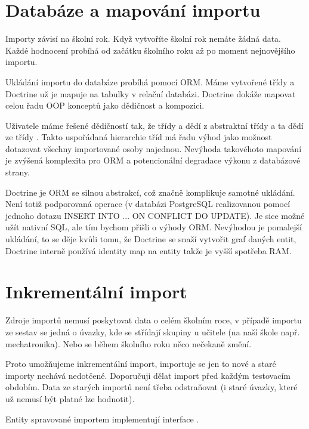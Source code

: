 \section{Databáze a mapování importu}

Importy závisí na školní rok. Když vytvoříte školní rok nemáte žádná data. Každé hodnocení probíhá od začátku školního roku až po moment nejnovějšího importu.

Ukládání importu do databáze probíhá pomocí ORM. Máme vytvořené třídy a Doctrine už je mapuje na tabulky v relační databázi. Doctrine dokáže mapovat celou řadu OOP konceptů jako dědičnost a kompozici.

Uživatele máme řešené dědičností tak, že třídy  a  dědí z abstraktní třídy  a ta dědí ze třídy . Takto uspořádaná hierarchie tříd má řadu výhod jako možnost dotazovat všechny importované osoby najednou.  Nevýhoda takovéhoto mapování je zvýšená komplexita pro ORM a potencionální degradace výkonu z databázové strany.

Doctrine je ORM se silnou abstrakcí, což značně komplikuje samotné ukládání. Není totiž podporovaná operace (v databázi PostgreSQL realizovanou pomocí jednoho dotazu INSERT INTO ... ON CONFLICT DO UPDATE). Je sice možné užít nativní SQL, ale tím bychom přišli o výhody ORM.
Nevýhodou je pomalejší ukládání, to se děje kvůli tomu, že Doctrine se snaží vytvořit graf daných entit, Doctrine interně používá identity map na entity takže je vyšší spotřeba RAM.



\section{Inkrementální import}

Zdroje importů nemusí poskytovat data o celém školním roce, v případě importu ze sestav se jedná o úvazky, kde se střídají skupiny u učitele (na naší škole např. mechatronika).
 Nebo se během školního roku něco nečekaně změní.

Proto umožňujeme inkrementální import, importuje se jen to nové a staré importy nechává nedotčené. Doporučuji dělat import před každým testovacím obdobím. Data ze starých importů není třeba odstraňovat (i staré úvazky, které už nemusí být platné lze hodnotit). 

Entity spravované importem implementují interface .

